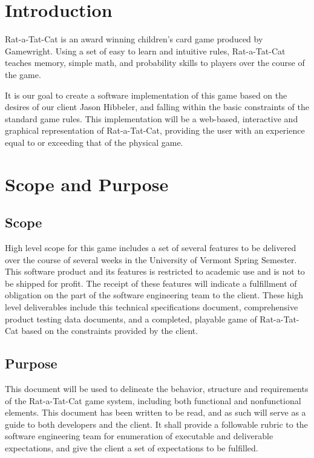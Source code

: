 \documentclass[12pt]{IEEEtran}
\begin{document}
\section{Introduction}
\label{sec:introduction}

	Rat-a-Tat-Cat is an award winning children’s card game produced by Gamewright. Using a set of easy to learn and intuitive rules, Rat-a-Tat-Cat teaches memory, simple math, and probability skills to players over the course of the game. 
	
	It is our goal to create a software implementation of this game based on the desires of our client Jason Hibbeler, and falling within the basic constraints of the standard game rules. This implementation will be a web-based, interactive and graphical representation of Rat-a-Tat-Cat, providing the user with an experience equal to or exceeding that of the physical game.

\section{Scope and Purpose}
\label{sec:scope}

\subsection{Scope}
\label{subsec:scope}

	High level scope for this game includes a set of several features to be delivered over the course of several weeks in the University of Vermont Spring Semester. This software product and its features is restricted to academic use and is not to be shipped for profit. The receipt of these features will indicate a fulfillment of obligation on the part of the software engineering team to the client. These high level deliverables include this technical specifications document, comprehensive product testing data documents, and a completed, playable game of Rat-a-Tat-Cat based on the constraints provided by the client.

\subsection{Purpose}
\label{subsec:purpose}

	This document will be used to delineate the behavior, structure and requirements of the Rat-a-Tat-Cat game system, including both functional and nonfunctional elements. This document has been written to be read, and as such will serve as a guide to both developers and the client. It shall provide a followable rubric to the software engineering team for enumeration of executable and deliverable expectations, and give the client a set of expectations to be fulfilled. 
	
\end{document}
